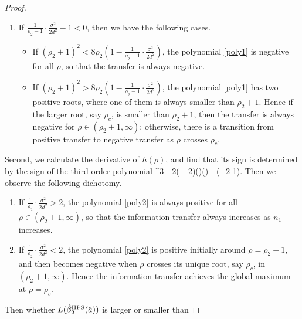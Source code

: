 \begin{proof}
\begin{enumerate}
\item If $\frac{1}{\rho_2-1}\cdot \frac{\sigma^2}{2d^2}-1 < 0$, then we have the following cases.

\begin{itemize}
\item If $(\rho_2+1)^2 < 8\rho_2 \left( 1- \frac{1}{\rho_2-1}\cdot \frac{\sigma^2}{2d^2}  \right)$, the polynomial \eqref{poly1} is negative for all $\rho$, so that the transfer is always negative.

\item If $(\rho_2+1)^2 > 8\rho_2 \left( 1- \frac{1}{\rho_2-1}\cdot \frac{\sigma^2}{2d^2}  \right)$, the polynomial \eqref{poly1} has two positive roots, where one of them is always smaller than $\rho_2+1$. Hence if the larger root, say $\rho_c$, is smaller than $\rho_2+1$, then the transfer is always negative for $\rho\in (\rho_2+1,\infty)$; otherwise, there is a transition from positive transfer to negative transfer as $\rho$ crosses $\rho_c$.
\end{itemize}
\end{enumerate}
Second, we calculate the derivative of $h(\rho)$, and find that its sign  is determined by the sign of the third order polynomial
\be\label{poly2}
 \cdot {} \rho^3 - 2(\rho-\rho_2)()()   - (\rho_2-1)\rho .\ee
Then we observe the following dichotomy. %
\begin{enumerate}
\item If $\frac{1}{\rho_2}\cdot \frac{\sigma^2}{2d^2} > 2$, the polynomial \eqref{poly2} is always positive for all $\rho\in (\rho_2+1,\infty)$, so that the information transfer always increases as $n_1$ increases.

\item If $\frac{1}{\rho_2}\cdot \frac{\sigma^2}{2d^2} < 2$, the polynomial \eqref{poly2} is positive initially around $\rho=\rho_2+1$, and then becomes negative when $\rho$ crosses its unique root, say $\rho_c$, in $(\rho_2+1,\infty)$. Hence the information transfer achieves the global maximum at $\rho=\rho_c$.
\end{enumerate}

\iffalse
Then whether $L(\hat{\beta}_2^{\textup{HPS}}(\hat a)) $ is larger or smaller than


\end{proof}

